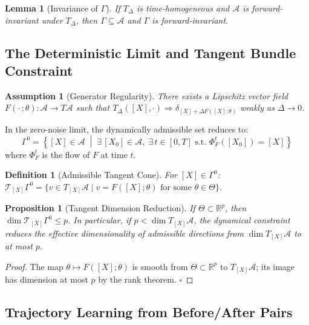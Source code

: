 \documentclass[12pt, oneside]{article}
\newtheorem{lemma}[theorem]{Lemma}
\newtheorem{proposition}[theorem]{Proposition}
\newtheorem{definition}[theorem]{Definition}
\newtheorem{assumption}[theorem]{Assumption}
\begin{document}
\begin{lemma}[Invariance of $\Gamma$]
If $T_\Delta$ is time-homogeneous and $\mathcal{A}$ is forward-invariant under $T_\Delta$,
then $\Gamma \subseteq \mathcal{A}$ and $\Gamma$ is forward-invariant.
\end{lemma}

\subsection{The Deterministic Limit and Tangent Bundle Constraint}

\begin{assumption}[Generator Regularity]
\label{ass:generator}
There exists a Lipschitz vector field $F(\cdot\,;\theta) : \mathcal{A} \to T\mathcal{A}$
such that $T_\Delta([X],\cdot) \Rightarrow \delta_{[X]+\Delta F([X];\theta)}$ weakly as
$\Delta \to 0$.
\end{assumption}

In the zero-noise limit, the dynamically admissible set reduces to:
\[
\Gamma^0 = \left\{ [X] \in \mathcal{A} \;\middle|\;
\exists\, [X_0] \in \mathcal{A},\; \exists\, t \in [0,T] \text{ s.t. }
\Phi^t_F([X_0]) = [X] \right\}
\]
where $\Phi^t_F$ is the flow of $F$ at time $t$.

\begin{definition}[Admissible Tangent Cone]
For $[X] \in \Gamma^0$:
$\mathcal{T}_{[X]}\Gamma^0 = \{v \in T_{[X]}\mathcal{A} \mid v = F([X];\theta)
\text{ for some } \theta \in \Theta\}$.
\end{definition}

\begin{proposition}[Tangent Dimension Reduction]
If $\Theta \subset \mathbb{R}^p$, then $\dim \mathcal{T}_{[X]}\Gamma^0 \le p$.
In particular, if $p < \dim T_{[X]}\mathcal{A}$, the dynamical constraint reduces the
effective dimensionality of admissible directions from $\dim T_{[X]}\mathcal{A}$ to
at most $p$.
\end{proposition}
\begin{proof}
The map $\theta \mapsto F([X];\theta)$ is smooth from $\Theta \subset \mathbb{R}^p$ to
$T_{[X]}\mathcal{A}$; its image has dimension at most $p$ by the rank theorem. $\square$
\end{proof}

\subsection{Trajectory Learning from Before/After Pairs}
\end{document}
